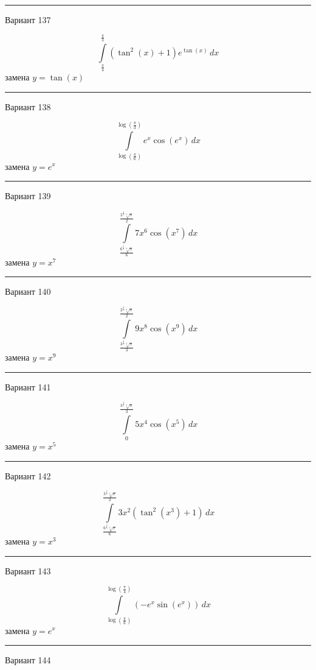 \documentclass[11pt]{report}
\begin{document}
\rule{\textwidth}{.2mm}

Вариант 137

$$\int\limits_{\frac{\pi}{4}}^{\frac{\pi}{3}} \left(\tan^{2}{\left(x \right)} + 1\right) e^{\tan{\left(x \right)}}\, dx$$
замена $y = \tan{\left(x \right)}$



\rule{\textwidth}{.2mm}

Вариант 138

$$\int\limits_{\log{\left(\frac{\pi}{6} \right)}}^{\log{\left(\frac{\pi}{3} \right)}} e^{x} \cos{\left(e^{x} \right)}\, dx$$
замена $y = e^{x}$



\rule{\textwidth}{.2mm}

Вариант 139

$$\int\limits_{\frac{6^{\frac{6}{7}} \sqrt[7]{\pi}}{6}}^{\frac{2^{\frac{5}{7}} \sqrt[7]{\pi}}{2}} 7 x^{6} \cos{\left(x^{7} \right)}\, dx$$
замена $y = x^{7}$



\rule{\textwidth}{.2mm}

Вариант 140

$$\int\limits_{\frac{3^{\frac{8}{9}} \sqrt[9]{\pi}}{3}}^{\frac{2^{\frac{8}{9}} \sqrt[9]{\pi}}{2}} 9 x^{8} \cos{\left(x^{9} \right)}\, dx$$
замена $y = x^{9}$



\rule{\textwidth}{.2mm}

Вариант 141

$$\int\limits_{0}^{\frac{3^{\frac{4}{5}} \sqrt[5]{\pi}}{3}} 5 x^{4} \cos{\left(x^{5} \right)}\, dx$$
замена $y = x^{5}$



\rule{\textwidth}{.2mm}

Вариант 142

$$\int\limits_{\frac{6^{\frac{2}{3}} \sqrt[3]{\pi}}{6}}^{\frac{3^{\frac{2}{3}} \sqrt[3]{\pi}}{3}} 3 x^{2} \left(\tan^{2}{\left(x^{3} \right)} + 1\right)\, dx$$
замена $y = x^{3}$



\rule{\textwidth}{.2mm}

Вариант 143

$$\int\limits_{\log{\left(\frac{\pi}{6} \right)}}^{\log{\left(\frac{\pi}{4} \right)}} \left(- e^{x} \sin{\left(e^{x} \right)}\right)\, dx$$
замена $y = e^{x}$



\rule{\textwidth}{.2mm}

Вариант 144
\end{document}
